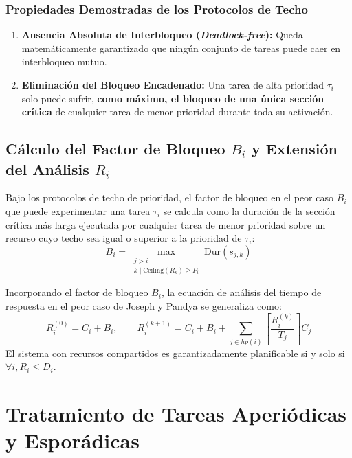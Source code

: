 \subsubsection{Propiedades Demostradas de los Protocolos de Techo}
\begin{enumerate}[leftmargin=*]
    \item \textbf{Ausencia Absoluta de Interbloqueo (\textit{Deadlock-free}):} Queda matemáticamente garantizado que ningún conjunto de tareas puede caer en interbloqueo mutuo.
    \item \textbf{Eliminación del Bloqueo Encadenado:} Una tarea de alta prioridad $\tau_i$ solo puede sufrir, \textbf{como máximo, el bloqueo de una única sección crítica} de cualquier tarea de menor prioridad durante toda su activación.
\end{enumerate}

\subsection{Cálculo del Factor de Bloqueo \texorpdfstring{$B_i$}{Bi} y Extensión del Análisis \texorpdfstring{$R_i$}{Ri}}
Bajo los protocolos de techo de prioridad, el factor de bloqueo en el peor caso $B_i$ que puede experimentar una tarea $\tau_i$ se calcula como la duración de la sección crítica más larga ejecutada por cualquier tarea de menor prioridad sobre un recurso cuyo techo sea igual o superior a la prioridad de $\tau_i$:
\begin{equation}
B_i = \max_{\substack{j > i \\ k \mid \text{Ceiling}(R_k) \ge P_i}} \text{Dur}(s_{j,k})
\end{equation}

Incorporando el factor de bloqueo $B_i$, la ecuación de análisis del tiempo de respuesta en el peor caso de Joseph y Pandya se generaliza como:
\begin{equation}
\label{eq:response_time_blocking}
R_i^{(0)} = C_i + B_i, \qquad R_i^{(k+1)} = C_i + B_i + \sum_{j \in hp(i)} \left\lceil \frac{R_i^{(k)}}{T_j} \right\rceil C_j
\end{equation}
El sistema con recursos compartidos es garantizadamente planificable si y solo si $\forall i, R_i \le D_i$.

\section{Tratamiento de Tareas Aperiódicas y Esporádicas}

